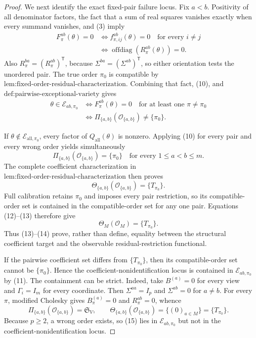 \documentclass{article}
\begin{document}
\begin{proof}
We next identify the exact fixed-pair failure locus.  Fix \(a<b\).  Positivity of all denominator factors, the fact that a sum of real squares vanishes exactly when every summand vanishes, and (3) imply
\[
\begin{aligned}
F_\pi^{ab}(\theta)=0
&\Longleftrightarrow f_{\pi,ij}^{ab}(\theta)=0
\quad\text{for every }i\ne j\\
&\Longleftrightarrow \operatorname{offdiag}(R_\pi^{ab}(\theta))=0.
\end{aligned}
\tag{10}
\]
Also \(R_\pi^{ba}=(R_\pi^{ab})^{\mathsf T}\), because \(\Sigma^{ba}=(\Sigma^{ab})^{\mathsf T}\), so either orientation tests the unordered pair.  The true order \(\pi_0\) is compatible by \(\text{lem:fixed-order-residual-characterization}\).  Combining that fact, (10), and \(\text{def:pairwise-exceptional-variety}\) gives
\[
\begin{aligned}
\theta\in\mathcal E_{ab,\pi_0}
&\Longleftrightarrow
F_\pi^{ab}(\theta)=0\quad\text{for at least one }\pi\ne\pi_0\\
&\Longleftrightarrow
\Pi_{\{a,b\}}(\mathcal O_{\{a,b\}})\ne\{\pi_0\}.
\end{aligned}
\tag{11}
\]

If \(\theta\notin\mathcal E_{\mathrm{all},\pi_0}\), every factor of \(Q_{\mathrm{all}}(\theta)\) is nonzero.  Applying (10) for every pair and every wrong order yields simultaneously
\[
\Pi_{\{a,b\}}(\mathcal O_{\{a,b\}})=\{\pi_0\}
\quad\text{for every }1\le a<b\le m.
\tag{12}
\]
The complete coefficient characterization in \(\text{lem:fixed-order-residual-characterization}\) then proves
\[
\Theta_{\{a,b\}}(\mathcal O_{\{a,b\}})=\{T_{\pi_0}\}.
\tag{13}
\]
Full calibration retains \(\pi_0\) and imposes every pair restriction, so its compatible-order set is contained in the compatible-order set for any one pair.  Equations (12)--(13) therefore give
\[
\Theta_M(\mathcal O_M)=\{T_{\pi_0}\}.
\tag{14}
\]
Thus (13)--(14) prove, rather than define, equality between the structural coefficient target and the observable residual-restriction functional.

If the pairwise coefficient set differs from \(\{T_{\pi_0}\}\), then its compatible-order set cannot be \(\{\pi_0\}\).  Hence the coefficient-nonidentification locus is contained in \(\mathcal E_{ab,\pi_0}\) by (11).  The containment can be strict.  Indeed, take \(B^{(a)}=0\) for every view and \(\Gamma_i=I_m\) for every coordinate.  Then \(\Sigma^{aa}=I_p\) and \(\Sigma^{ab}=0\) for \(a\ne b\).  For every \(\pi\), modified Cholesky gives \(B_\pi^{(a)}=0\) and \(R_\pi^{ab}=0\), whence
\[
\Pi_{\{a,b\}}(\mathcal O_{\{a,b\}})=\mathfrak S_V,
\qquad
\Theta_{\{a,b\}}(\mathcal O_{\{a,b\}})
=\{(0)_{a\in M}\}=\{T_{\pi_0}\}.
\tag{15}
\]
Because \(p\ge2\), a wrong order exists, so (15) lies in \(\mathcal E_{ab,\pi_0}\) but not in the coefficient-nonidentification locus.


\end{proof}
\end{document}
